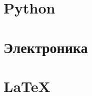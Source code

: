 \documentclass[oneside,12pt]{article}
\newcommand{\py}{Python}
\begin{document}
\section{\py}
\cite{pyotkidach,pythink}

\section{Электроника}
\cite{bcollis}

\section{\LaTeX}

\cite{ebooktex}

\printbibliography
\end{document}

